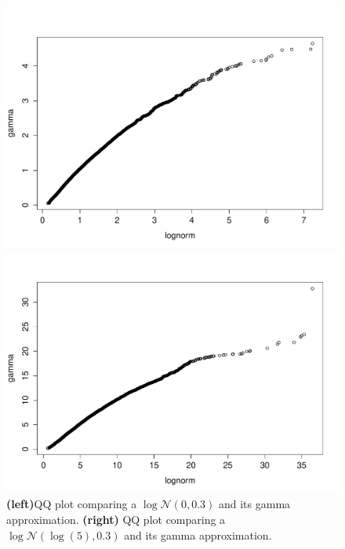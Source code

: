 \documentclass{article}
\begin{document}
\begin{figure}[htb]
	\centering
	\begin{minipage}{.45\textwidth}
		\centering
		\includegraphics[width=0.97\linewidth]{bootstrap-filter/approx03.pdf}
	\end{minipage}
	\begin{minipage}{.45\textwidth}
		\centering
		\includegraphics[width=0.97\linewidth]{bootstrap-filter/approxcoeff5sigma03.pdf}
	\end{minipage}
	\caption{\textbf{(left)}QQ plot comparing a $\log\mathcal{N}(0, 0.3)$ and its gamma approximation. \textbf{(right)} QQ plot comparing a $\log\mathcal{N}(\log(5), 0.3)$ and its gamma approximation.}
	\label{fig:approx}
\end{figure}
\end{document}
